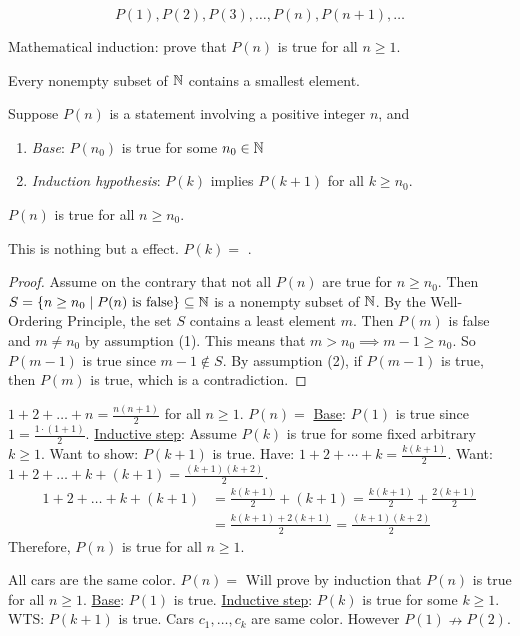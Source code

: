 \documentclass[]{article}
\begin{document}
$$P(1),P(2),P(3),\dots,P(n),P(n+1),\dots$$

Mathematical induction: prove that $P(n)$ is true for all $n\geq 1$.

\begin{definition}
	 Every nonempty subset of $\mathbb{N}$ contains a smallest element.
\end{definition}
\begin{theorem}
	 Suppose $P(n)$ is a statement involving a positive integer $n$, and
	\begin{enumerate}
		\item \textit{Base}: $P(n_0)$ is true for some $n_0\in\mathbb{N}$
		\item \textit{Induction hypothesis}: $P(k)$ implies $P(k+1)$ for all $k\geq n_0$.
	\end{enumerate}
	$P(n)$ is true for all $n\geq n_0$.
\end{theorem}
\begin{remark}
	This is nothing but a  effect. $P(k) = $ .
\end{remark}
\begin{proof}
	Assume on the contrary that not all $P(n)$ are true for $n\geq n_0$. Then $S = \{n\geq n_0\mid P(n) \text{ is false}\}\subseteq \mathbb{N}$ is a nonempty subset of $\mathbb{N}$. By the Well-Ordering Principle, the set $S$ contains a least element $m$. Then $P(m)$ is false and $m\neq n_0$ by assumption (1). This means that $m>n_0 \implies m-1\geq n_0$. So $P(m-1)$ is true since $m-1\notin S$. By assumption (2), if $P(m-1)$ is true, then $P(m)$ is true, which is a contradiction.
\end{proof}
\begin{example}
	$1+2+\dots+n = \frac{n(n+1)}{2}$ for all $n\geq 1$. $P(n) = $ 
	\ul{Base}: $P(1)$ is true since $1 = \frac{1\cdot(1+1)}{2}$.
	\ul{Inductive step}: Assume $P(k)$ is true for some fixed arbitrary $k \geq 1$. Want to show: $P(k+1)$ is true. Have: $1+2+\cdots+k = \frac{k(k+1)}{2}$. Want: $1+2+\dots+k + (k+1) = \frac{(k+1)(k+2)}{2}$.
	\begin{align*}
		1+2+\dots + k + (k+1) &= \frac{k(k+1)}{2} + (k+1) = \frac{k(k+1)}{2} + \frac{2(k+1)}{2} \\
		&= \frac{k(k+1) + 2(k+1)}{2} = \frac{(k+1)(k+2)}{2}
	\end{align*}
	Therefore, $P(n)$ is true for all $n\geq 1$.
\end{example}
\begin{example}
	All cars are the same color. $P(n) = $  Will prove by induction that $P(n)$ is true for all $n\geq 1$. \ul{Base}: $P(1)$ is true. \ul{Inductive step}: $P(k)$ is true for some $k\geq 1$. WTS: $P(k+1)$ is true. Cars $c_1,\dots,c_k$ are same color. However $P(1)\nrightarrow P(2)$.
\end{example}
\end{document}
